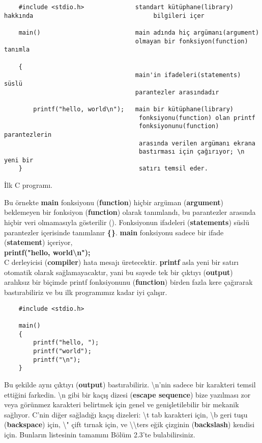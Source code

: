 \documentclass[a4paper,12pt,oneside]{book}
\begin{document}
\begin{lstlisting}
    #include <stdio.h>              standart kütüphane(library) hakkında                                 bilgileri içer

    main()                          main adında hiç argümanı(argument)
                                    olmayan bir fonksiyon(function) tanımla

    {
                                    main'in ifadeleri(statements) süslü
                                    parantezler arasındadır

        printf("hello, world\n");   main bir kütüphane(library)
                                     fonksiyonu(function) olan printf
                                     fonksiyonunu(function) parantezlerin
                                     arasında verilen argümanı ekrana
                                     bastırması için çağırıyor; \n yeni bir
    }                                satırı temsil eder.
\end{lstlisting}
\begin{center}İlk C programı.\end{center}
\pagebreak

Bu örnekte \textbf{main} fonksiyonu (\textbf{function}) hiçbir argüman (\textbf{argument}) beklemeyen bir fonksiyon (\textbf{function}) olarak tanımlandı, bu parantezler arasında hiçbir veri olmamasıyla gösterilir ().
Fonksiyonun ifadeleri (\textbf{statements}) süslü parantezler içerisinde tanımlanır \textbf{\{\}}. \textbf{main} fonksiyonu sadece bir ifade (\textbf{statement}) içeriyor, \\

\textbf{printf("hello, world\textbackslash n");} \\

C derleyicisi (\textbf{compiler}) hata mesajı üretecektir.
\textbf{printf} asla yeni bir satırı otomatik olarak sağlamayacaktır, yani bu sayede tek bir çıktıyı (\textbf{output}) aralıksız bir biçimde printf fonksiyonunu (\textbf{function}) birden fazla kere çağırarak bastırabiliriz ve bu ilk programımız kadar iyi çalışır.

\begin{lstlisting}
    #include <stdio.h>

    main()
    {
        printf("hello, ");
        printf("world");
        printf("\n");
    }
\end{lstlisting}

Bu şekilde aynı çıktıyı (\textbf{output}) bastırabiliriz.
\textbackslash n'nin sadece bir karakteri temsil ettiğini farkedin. \textbackslash n  gibi bir kaçış dizesi (\textbf{escape sequence}) bize yazılması zor veya görünmez karakteri belirtmek için genel ve genişletilebilir bir mekanik sağlıyor. C'nin diğer sağladığı kaçış dizeleri: \textbackslash t tab karakteri için, \textbackslash b geri tuşu (\textbf{backspace}) için, \textbackslash " çift tırnak için, ve  \textbackslash \textbackslash \hspace*{1mm}ters eğik çizginin (\textbf{backslash}) kendisi için. Bunların listesinin tamamını Bölüm 2.3'te bulabilirsiniz. \\
\end{document}
